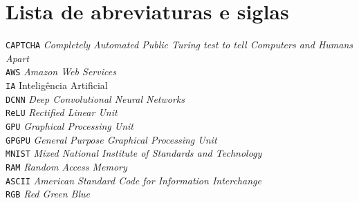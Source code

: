 
\chapter*{Lista de abreviaturas e siglas}

\noindent
\verb"CAPTCHA" \dotfill \textit{Completely Automated Public Turing
  test to tell Computers and Humans Apart}\\
\verb"AWS" \dotfill \textit{Amazon Web Services}\\
\verb"IA" \dotfill Inteligência Artificial\\
\verb"DCNN" \dotfill \textit{Deep Convolutional Neural Networks}\\
\verb"ReLU" \dotfill \textit{Rectified Linear Unit}\\
\verb"GPU" \dotfill \textit{Graphical Processing Unit}\\
\verb"GPGPU" \dotfill \textit{General Purpose Graphical Processing
  Unit}\\
\verb"MNIST" \dotfill \textit{Mixed National Institute of Standards
  and Technology}\\
\verb"RAM" \dotfill \textit{Random Access Memory}\\
\verb"ASCII" \dotfill \textit{American Standard Code for Information
  Interchange}\\
\verb"RGB" \dotfill \textit{Red Green Blue}\\